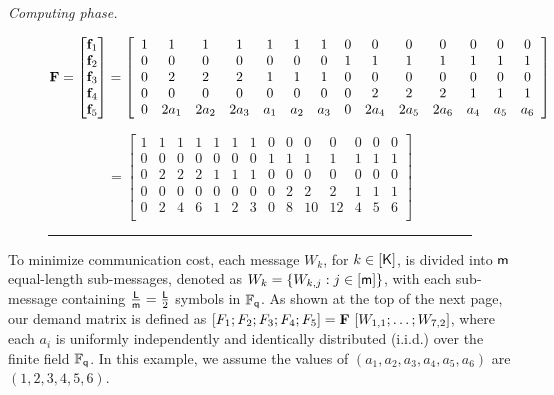 \documentclass[conference,letterpaper]{IEEEtran}
\begin{document}
\begin{example}
{\it Computing phase.}
    \begin{figure}
\begin{equation}
 {\bf F} = \begin{bmatrix}  
{{\bf f}_1 }\\
{{\bf f}_2 }\\
{{\bf f}_3 }\\
{{\bf f}_4 }\\
{{\bf f}_5 }
 \end{bmatrix}
 = \left[
\begin{array}{cccccccccccccc}
  1 & 1 & 1 & 1 & 1 & 1 & 1 & 0 & 0 & 0 & 0 & 0 & 0 & 0 \\
  0 & 0 & 0 & 0 & 0 & 0 & 0 & 1 & 1 & 1 & 1 & 1 & 1 & 1 \\
  0 & 2 & 2 & 2 & 1 & 1 & 1 & 0 & 0 & 0 & 0 & 0 & 0 & 0 \\
  0 & 0 & 0 & 0 & 0 & 0 & 0 & 0 & 2 & 2 & 2 & 1 & 1 & 1 \\
  0 & 2a_1 & 2a_2 & 2a_3 & a_1 & a_2 & a_3 & 0 & 2a_4 & 2a_5 & 2a_6 & a_4 & a_5 & a_6 \\
\end{array}
\right]
\end{equation}

\begin{equation}
 = \left[
 \begin{array}{cccccccccccccc}
   1 & 1 & 1 & 1 & 1 & 1 & 1 & 0 & 0 & 0 & 0 & 0 & 0 & 0 \\
   0 & 0 & 0 & 0 & 0 & 0 & 0 & 1 & 1 & 1 & 1 & 1 & 1 & 1 \\
   0 & 2 & 2 & 2 & 1 & 1 & 1 & 0 & 0 & 0 & 0 & 0 & 0 & 0 \\
   0 & 0 & 0 & 0 & 0 & 0 & 0 & 0 & 2 & 2 & 2 & 1 & 1 & 1 \\
   0 & 2 & 4 & 6 & 1 & 2 & 3 & 0 & 8 & 10 & 12 & 4 & 5 & 6 \\
\end{array}
\right]
\end{equation}
\rule{\textwidth}{0.2pt} %
\end{figure}
To minimize communication cost, each message $W_k$, for $k \in [{\sf K}]$, is divided into ${\sf m}$ equal-length sub-messages, denoted as $W_k = \{W_{k,j} : j \in [{\sf m}]\}$, with each sub-message containing $\frac{{\sf L}}{{\sf m}} = \frac{{\sf L}}{2}$ symbols in $\mathbb{F}_{{\sf q}}$.
As shown at the top of the next page, our demand matrix is defined as $[F_1; F_2; F_3; F_4; F_5] = {\bf F} \ [W_{1,1}; \ldots; W_{7,2}]$, where each $a_i$ is uniformly independently and identically distributed (i.i.d.) over the finite field $\mathbb{F}_{{\sf q}}$. In this example, we assume the values of $(a_1, a_2, a_3, a_4, a_5, a_6)$ are $(1, 2, 3, 4, 5, 6)$.



\end{example}
\end{document}
